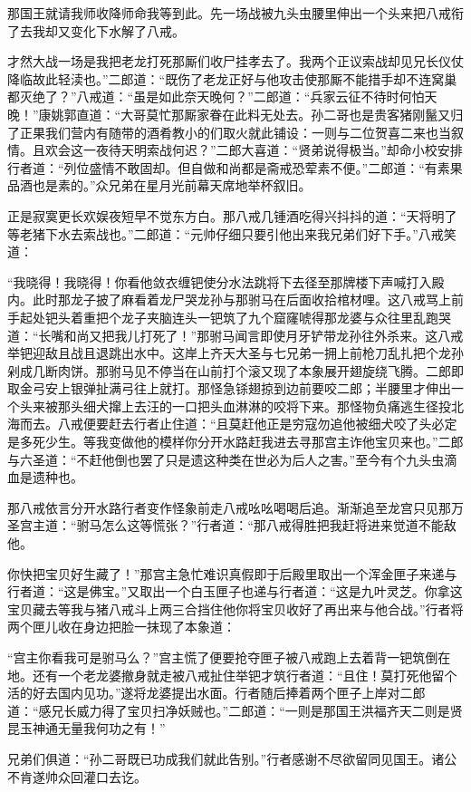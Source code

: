 \documentclass[12pt,UTF8]{ctexbook}
\begin{document}
那国王就请我师收降师命我等到此。先一场战被九头虫腰里伸出一个头来把八戒衔了去我却又变化下水解了八戒。

才然大战一场是我把老龙打死那厮们收尸挂孝去了。我两个正议索战却见兄长仪仗降临故此轻渎也。”二郎道：“既伤了老龙正好与他攻击使那厮不能措手却不连窝巢都灭绝了？”八戒道：“虽是如此奈天晚何？”二郎道：“兵家云征不待时何怕天晚！”康姚郭直道：“大哥莫忙那厮家眷在此料无处去。孙二哥也是贵客猪刚鬣又归了正果我们营内有随带的酒肴教小的们取火就此铺设：一则与二位贺喜二来也当叙情。且欢会这一夜待天明索战何迟？”二郎大喜道：“贤弟说得极当。”却命小校安排行者道：“列位盛情不敢固却。但自做和尚都是斋戒恐荤素不便。”二郎道：“有素果品酒也是素的。”众兄弟在星月光前幕天席地举杯叙旧。

正是寂寞更长欢娱夜短早不觉东方白。那八戒几锺酒吃得兴抖抖的道：“天将明了等老猪下水去索战也。”二郎道：“元帅仔细只要引他出来我兄弟们好下手。”八戒笑道：

“我晓得！我晓得！你看他敛衣缠钯使分水法跳将下去径至那牌楼下声喊打入殿内。此时那龙子披了麻看着龙尸哭龙孙与那驸马在后面收拾棺材哩。这八戒骂上前手起处钯头着重把个龙子夹脑连头一钯筑了九个窟窿唬得那龙婆与众往里乱跑哭道：“长嘴和尚又把我儿打死了！”那驸马闻言即使月牙铲带龙孙往外杀来。这八戒举钯迎敌且战且退跳出水中。这岸上齐天大圣与七兄弟一拥上前枪刀乱扎把个龙孙剁成几断肉饼。那驸马见不停当在山前打个滚又现了本象展开翅旋绕飞腾。二郎即取金弓安上银弹扯满弓往上就打。那怪急铩翅掠到边前要咬二郎；半腰里才伸出一个头来被那头细犬撺上去汪的一口把头血淋淋的咬将下来。那怪物负痛逃生径投北海而去。八戒便要赶去行者止住道：“且莫赶他正是穷寇勿追他被细犬咬了头必定是多死少生。等我变做他的模样你分开水路赶我进去寻那宫主诈他宝贝来也。”二郎与六圣道：“不赶他倒也罢了只是遗这种类在世必为后人之害。”至今有个九头虫滴血是遗种也。

那八戒依言分开水路行者变作怪象前走八戒吆吆喝喝后追。渐渐追至龙宫只见那万圣宫主道：“驸马怎么这等慌张？”行者道：“那八戒得胜把我赶将进来觉道不能敌他。

你快把宝贝好生藏了！”那宫主急忙难识真假即于后殿里取出一个浑金匣子来递与行者道：“这是佛宝。”又取出一个白玉匣子也递与行者道：“这是九叶灵芝。你拿这宝贝藏去等我与猪八戒斗上两三合挡住他你将宝贝收好了再出来与他合战。”行者将两个匣儿收在身边把脸一抹现了本象道：

“宫主你看我可是驸马么？”宫主慌了便要抢夺匣子被八戒跑上去着背一钯筑倒在地。还有一个老龙婆撤身就走被八戒扯住举钯才筑行者道：“且住！莫打死他留个活的好去国内见功。”遂将龙婆提出水面。行者随后捧着两个匣子上岸对二郎道：“感兄长威力得了宝贝扫净妖贼也。”二郎道：“一则是那国王洪福齐天二则是贤昆玉神通无量我何功之有！”

兄弟们俱道：“孙二哥既已功成我们就此告别。”行者感谢不尽欲留同见国王。诸公不肯遂帅众回灌口去讫。
\end{document}
